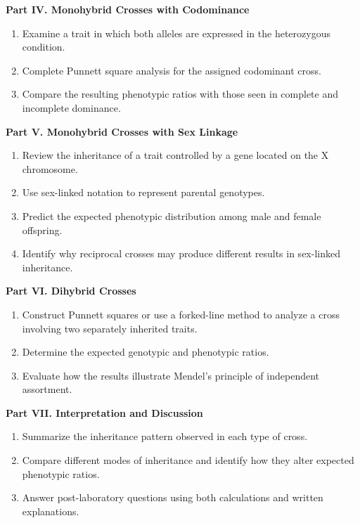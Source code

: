 \documentclass[
  letterpaper,
  DIV=11,
  numbers=noendperiod]{scrreprt}
\begin{document}
\textbf{Part IV. Monohybrid Crosses with Codominance}

\begin{enumerate}
\def\labelenumi{\arabic{enumi}.}
\item
  Examine a trait in which both alleles are expressed in the
  heterozygous condition.
\item
  Complete Punnett square analysis for the assigned codominant cross.
\item
  Compare the resulting phenotypic ratios with those seen in complete
  and incomplete dominance.
\end{enumerate}

\textbf{Part V. Monohybrid Crosses with Sex Linkage}

\begin{enumerate}
\def\labelenumi{\arabic{enumi}.}
\item
  Review the inheritance of a trait controlled by a gene located on the
  X chromosome.
\item
  Use sex-linked notation to represent parental genotypes.
\item
  Predict the expected phenotypic distribution among male and female
  offspring.
\item
  Identify why reciprocal crosses may produce different results in
  sex-linked inheritance.
\end{enumerate}

\textbf{Part VI. Dihybrid Crosses}

\begin{enumerate}
\def\labelenumi{\arabic{enumi}.}
\item
  Construct Punnett squares or use a forked-line method to analyze a
  cross involving two separately inherited traits.
\item
  Determine the expected genotypic and phenotypic ratios.
\item
  Evaluate how the results illustrate Mendel's principle of independent
  assortment.
\end{enumerate}

\textbf{Part VII. Interpretation and Discussion}

\begin{enumerate}
\def\labelenumi{\arabic{enumi}.}
\item
  Summarize the inheritance pattern observed in each type of cross.
\item
  Compare different modes of inheritance and identify how they alter
  expected phenotypic ratios.
\item
  Answer post-laboratory questions using both calculations and written
  explanations.
\end{enumerate}
\end{document}
